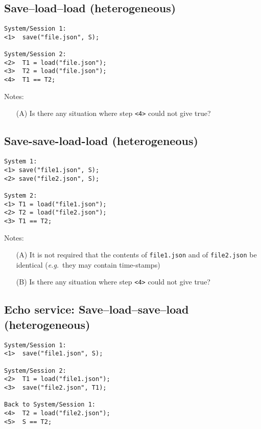\documentclass{article}
\newcommand \eg {\textit{e.g.}}
\begin{document}
\subsection{Save--load--load (heterogeneous)}

\begin{verbatim}
System/Session 1:
<1>  save("file.json", S);

System/Session 2:
<2>  T1 = load("file.json");
<3>  T2 = load("file.json");
<4>  T1 == T2;
\end{verbatim}

Notes:
\begin{itemize}
\item[(A)]  Is there any situation where step \verb|<4>| could not give true?
\end{itemize}


\subsection{Save-save-load-load (heterogeneous)}

\begin{verbatim}
System 1:
<1> save("file1.json", S);
<2> save("file2.json", S);

System 2:
<1> T1 = load("file1.json");
<2> T2 = load("file2.json");
<3> T1 == T2;
\end{verbatim}

Notes:
\begin{itemize}
\item[(A)]  It is not required that the contents of \verb|file1.json| and of
     \verb|file2.json| be identical (\eg~they may contain time-stamps)

\item[(B)]  Is there any situation where step \verb|<4>| could not give true?
\end{itemize}

\subsection{Echo service: Save--load--save--load (heterogeneous)}

\begin{verbatim}
System/Session 1:
<1>  save("file1.json", S);

System/Session 2:
<2>  T1 = load("file1.json");
<3>  save("file2.json", T1);

Back to System/Session 1:
<4>  T2 = load("file2.json");
<5>  S == T2;
\end{verbatim}
\end{document}
